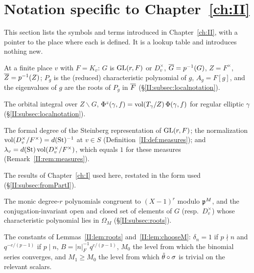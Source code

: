 \section{Notation specific to \texorpdfstring{Chapter~\ref{ch:II}}{Chapter 5}}\label{II:subsec:glossII}
This section lists the symbols and terms introduced in Chapter~\ref{ch:II}, with a pointer to the place where each is defined. It is a lookup table and introduces nothing new.

\begin{description}[style=nextline,leftmargin=1.5em]
\item[$G$, $\Gb$, $Z$, $\Zb$; $P_g$, $A_g$; eigenvalues] At a finite place $v$ with $F=K_v$: $G$ is $\operatorname{GL}(r,F)$ or $D_v^\times$, $\overline G=p^{-1}(G)$, $Z=F^\times$, $\overline{Z}=p^{-1}(Z)$; $P_g$ is the (reduced) characteristic polynomial of $g$, $A_g=F[g]$, and the eigenvalues of $g$ are the roots of $P_g$ in $\overline{F}$ (\S\ref{II:subsec:localnotation}).
\item[$\Phi^z$] The orbital integral over $Z\backslash G$, $\Phi^z(\gamma,f)=\operatorname{vol}(T_\gamma/Z)\,\Phi(\gamma,f)$ for regular elliptic $\gamma$ \cite[\S6]{FK86} (\S\ref{II:subsec:localnotation}).
\item[$d(\St)$, compatible measures, $\lambda_v$] The formal degree of the Steinberg representation of $\operatorname{GL}(r,F)$; the normalization $\operatorname{vol}(D_v^\times/F^\times)=d(\mathrm{St})^{-1}$ at $v\in S$ (Definition~\ref{II:def:measures}); and $\lambda_v=d(\mathrm{St})\operatorname{vol}(D_v^\times/F^\times)$, which equals $1$ for these measures (Remark~\ref{II:rem:measures}).
\item[(I1)--(I11)] The results of Chapter~\ref{ch:I} used here, restated in the form used (\S\ref{II:subsec:fromPartI}).
\item[$\Omega_M$, $V_M$, $V_{D,M}$] The monic degree-$r$ polynomials congruent to $(X-1)^r$ modulo $\mathfrak{p}^M$, and the conjugation-invariant open and closed set of elements of $G$ (resp.\ $D_v^\times$) whose characteristic polynomial lies in $\Omega_M$ (\S\ref{II:subsec:roots}).
\item[$\delta_n$, $B$, $M_0$, $M_1$] The constants of Lemmas~\ref{II:lem:roots} and~\ref{II:lem:chooseM}: $\delta_n=1$ if $p\nmid n$ and $q^{-e/(p-1)}$ if $p\mid n$, $B=|n|_F^{-1}q^{e/(p-1)}$, $M_0$ the level from which the binomial series converges, and $M_1\ge M_0$ the level from which $\tilde\theta\circ\sigma$ is trivial on the relevant scalars.

\end{description}
